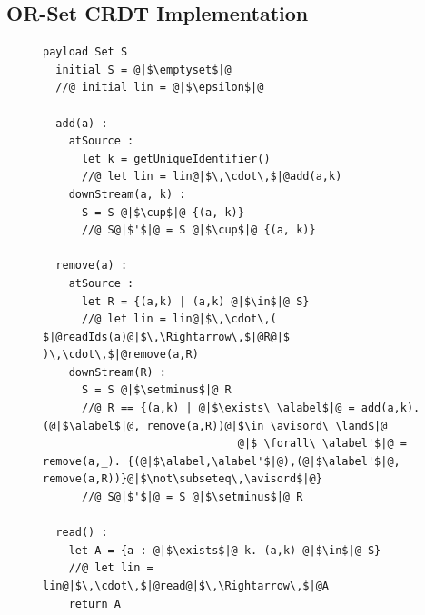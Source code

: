 

\subsection{OR-Set CRDT Implementation}
\label{sec:or-set-crdt}

\begin{figure}[!t]
  \centering
\begin{lstlisting}[caption={Pseudo-code of the OR-Set CRDT},basicstyle=\ttfamily\footnotesize,captionpos=b,label={lst:or-set}]
  payload Set S
  initial S = @|$\emptyset$|@
  //@ initial lin = @|$\epsilon$|@

  add(a) :
    atSource :
      let k = getUniqueIdentifier()
      //@ let lin = lin@|$\,\cdot\,$|@add(a,k)
    downStream(a, k) :
      S = S @|$\cup$|@ {(a, k)}
      //@ S@|$'$|@ = S @|$\cup$|@ {(a, k)}

  remove(a) :
    atSource :
      let R = {(a,k) | (a,k) @|$\in$|@ S}
      //@ let lin = lin@|$\,\cdot\,( $|@readIds(a)@|$\,\Rightarrow\,$|@R@|$ )\,\cdot\,$|@remove(a,R)
    downStream(R) :
      S = S @|$\setminus$|@ R
      //@ R == {(a,k) | @|$\exists\ \alabel$|@ = add(a,k). (@|$\alabel$|@, remove(a,R))@|$\in \avisord\ \land$|@
                              @|$ \forall\ \alabel'$|@ = remove(a,_). {(@|$\alabel,\alabel'$|@),(@|$\alabel'$|@, remove(a,R))}@|$\not\subseteq\,\avisord$|@}
      //@ S@|$'$|@ = S @|$\setminus$|@ R

  read() :
    let A = {a : @|$\exists$|@ k. (a,k) @|$\in$|@ S}
    //@ let lin = lin@|$\,\cdot\,$|@read@|$\,\Rightarrow\,$|@A
    return A
\end{lstlisting}
\end{figure}

